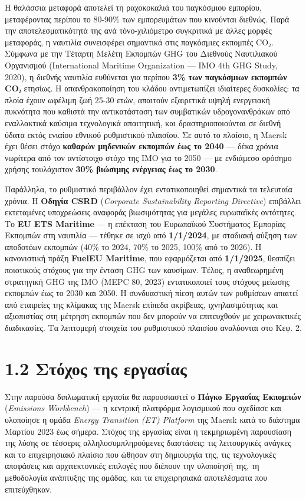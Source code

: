 \documentclass[11pt,a4paper,greek,twoside]{template-xe}
\begin{document}
Η θαλάσσια μεταφορά αποτελεί τη ραχοκοκαλιά του παγκόσμιου εμπορίου,
μεταφέροντας περίπου το 80-90\% των εμπορευμάτων που κινούνται διεθνώς.
Παρά την αποτελεσματικότητά της ανά τόνο-χιλιόμετρο συγκριτικά με άλλες
μορφές μεταφοράς, η ναυτιλία συνεισφέρει σημαντικά στις παγκόσμιες
εκπομπές CO₂. Σύμφωνα με την Τέταρτη Μελέτη Εκπομπών GHG του Διεθνούς
Ναυτιλιακού Οργανισμού (International Maritime Organization --- IMO 4th
GHG Study, 2020), η διεθνής ναυτιλία ευθύνεται για περίπου \textbf{3\%
των παγκόσμιων εκπομπών CO₂} ετησίως. Η απανθρακοποίηση του κλάδου
αντιμετωπίζει ιδιαίτερες δυσκολίες: τα πλοία έχουν ωφέλιμη ζωή 25-30
ετών, απαιτούν εξαιρετικά υψηλή ενεργειακή πυκνότητα που καθιστά την
αντικατάσταση των συμβατικών υδρογονανθράκων από εναλλακτικά καύσιμα
τεχνολογικά απαιτητική, και δραστηριοποιούνται σε διεθνή ύδατα εκτός
ενιαίου εθνικού ρυθμιστικού πλαισίου. Σε αυτό το πλαίσιο, η Maersk έχει
θέσει στόχο \textbf{καθαρών μηδενικών εκπομπών έως το 2040} --- δέκα
χρόνια νωρίτερα από τον αντίστοιχο στόχο της IMO για το 2050 --- με
ενδιάμεσο ορόσημο χρήσης τουλάχιστον \textbf{30\% βιώσιμης ενέργειας έως
το 2030}.

Παράλληλα, το ρυθμιστικό περιβάλλον έχει εντατικοποιηθεί σημαντικά τα
τελευταία χρόνια. Η \textbf{Οδηγία CSRD} (\emph{Corporate Sustainability
Reporting Directive}) επιβάλλει εκτεταμένες υποχρεώσεις αναφοράς
βιωσιμότητας για μεγάλες ευρωπαϊκές οντότητες. Το \textbf{EU ETS
Maritime} --- η επέκταση του Ευρωπαϊκού Συστήματος Εμπορίας Εκπομπών στη
ναυτιλία --- τέθηκε σε ισχύ από \textbf{1/1/2024}, με σταδιακή αύξηση
των αποδοτέων εκπομπών (40\% το 2024, 70\% το 2025, 100\% από το 2026).
Η κανονιστική πράξη \textbf{FuelEU Maritime}, που εφαρμόζεται από
\textbf{1/1/2025}, θεσπίζει ποιοτικούς στόχους για την ένταση GHG των
καυσίμων. Τέλος, η αναθεωρημένη στρατηγική GHG της IMO (MEPC 80, 2023)
εντατικοποιεί τους στόχους μείωσης εκπομπών έως το 2030 και 2050. Η
συνδυαστική πίεση αυτών των ρυθμίσεων απαιτεί από εταιρείες της κλίμακας
της Maersk επίπεδα ακρίβειας, ιχνηλασιμότητας και αξιοπιστίας στη
μέτρηση εκπομπών που δεν μπορούν να επιτευχθούν με χειρωνακτικές
διαδικασίες. Τα λεπτομερή στοιχεία του ρυθμιστικού πλαισίου αναλύονται
στο Κεφ. 2.

\section{1.2 Στόχος της
εργασίας}\label{ux3c3ux3c4ux3ccux3c7ux3bfux3c2-ux3c4ux3b7ux3c2-ux3b5ux3c1ux3b3ux3b1ux3c3ux3afux3b1ux3c2}

Στην παρούσα διπλωματική εργασία θα παρουσιαστεί ο \textbf{Πάγκο
Εργασίας Εκπομπών} (\emph{Emissions Workbench}) --- η κεντρική πλατφόρμα
λογισμικού που σχεδίασε και υλοποίησε η ομάδα \emph{Energy Transition
(ET) Platform} της Maersk κατά το διάστημα Μαρτίου 2023 έως σήμερα.
Στόχος της εργασίας είναι η τεκμηριωμένη παρουσίαση της λύσης σε
τέσσερις αλληλοσυμπληρούμενες διαστάσεις: τις λειτουργικές ανάγκες και
το επιχειρησιακό πλαίσιο που ώθησαν στη δημιουργία της, τις τεχνολογικές
αποφάσεις και αρχιτεκτονικές επιλογές που διέπουν την υλοποίησή της, τη
μεθοδολογία ανάπτυξης της ομάδας, και τα επιχειρησιακά αποτελέσματα που
επιτεύχθηκαν.
\end{document}
